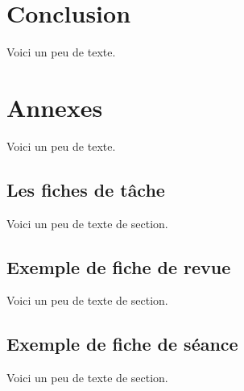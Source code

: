     \section{Conclusion}
    Voici un peu de texte.
    
    \section{Annexes}
    Voici un peu de texte.
    \subsection{Les fiches de tâche}
    Voici un peu de texte de section.
    \subsection{Exemple de fiche de revue}
    Voici un peu de texte de section.
    \subsection{Exemple de fiche de séance}
    Voici un peu de texte de section.
